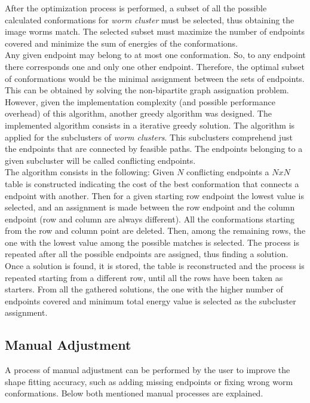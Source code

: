 After the optimization process is performed, a subset of all the possible calculated 
conformations for \emph{worm cluster} must be selected, thus obtaining the image
worms match. The selected subset must maximize the number of endpoints covered and 
minimize the sum of energies of the conformations.\\
Any given endpoint may belong to at most one conformation. So, to any endpoint
there corresponds one and only one other endpoint. Therefore, the optimal subset of
conformations would be the minimal assignment between the sets of endpoints.\\
This can be obtained by solving the non-bipartite graph assignation problem. However,
given the implementation complexity (and possible performance overhead) of this algorithm,
another greedy algorithm was designed. The implemented algorithm consists in a iterative 
greedy solution. The algorithm is applied for the subclusters of \emph{worm clusters}. 
This subclusters comprehend just the endpoints that are connected 
by feasible paths. The endpoints belonging to a given subcluster will be called 
conflicting endpoints.\\

The algorithm consists in the following:
Given $N$ conflicting endpoints a $NxN$ table is constructed indicating the cost
of the best conformation that connects a endpoint with another. Then for a given 
starting row endpoint the lowest value is selected, and an assignment is made
between the row endpoint and the column endpoint (row and column are always different).
All the conformations starting from the row and column point are deleted.
Then, among the remaining rows, the one with the lowest value among the possible matches
is selected. The process is repeated after all the possible endpoints are assigned, thus
finding a solution. Once a solution is found, it is stored, the table is reconstructed and
the process is repeated starting from a different row, until all the rows have been taken
as starters. From all the gathered solutions, the one with the higher number of endpoints
covered and minimum total energy value is selected as the subcluster assignment.

\subsection{Manual Adjustment}

A process of manual adjustment can be performed by the user to improve the shape fitting
accuracy, such as adding missing endpoints or fixing wrong worm conformations. Below
both mentioned manual processes are explained. 

